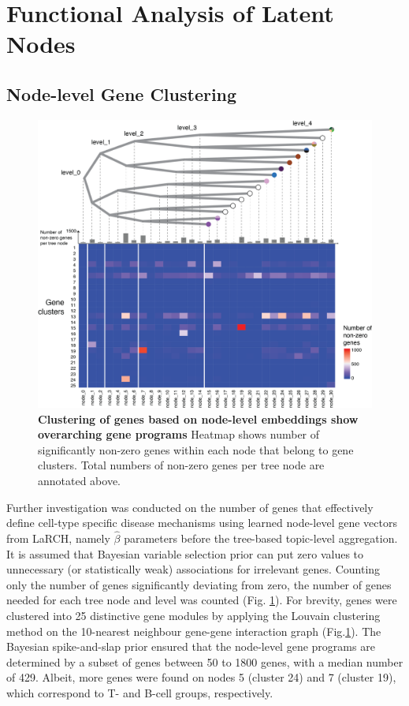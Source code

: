 \newpage
\section{Functional Analysis of Latent Nodes}

\subsection{Node-level Gene Clustering}

\begin{figure}
    \centering
    \includegraphics[width=\textwidth]{Figures/node_clusters.png}
    \caption{\textbf{Clustering of genes based on node-level embeddings show overarching gene programs} Heatmap shows number of significantly non-zero genes within each node that belong to gene clusters. Total numbers of non-zero genes per tree node are annotated above.}
    \label{fig:nodeanalysis}
\end{figure}

Further investigation was conducted on the number of genes that effectively define cell-type specific disease mechanisms using learned node-level gene vectors from LaRCH, namely $\hat{\beta}$ parameters before the tree-based topic-level aggregation. It is assumed that Bayesian variable selection prior can put zero values to unnecessary (or statistically weak) associations for irrelevant genes. Counting only the number of genes significantly deviating from zero, the number of genes needed for each tree node and level was counted (Fig. \ref{fig:nodeanalysis}). For brevity, genes were clustered into 25 distinctive gene modules by applying the Louvain clustering method on the 10-nearest neighbour gene-gene interaction graph (Fig.\ref{fig:nodeanalysis}). The Bayesian spike-and-slap prior ensured that the node-level gene programs are determined by a subset of genes between 50 to 1800 genes, with a median number of 429. Albeit, more genes were found on nodes 5 (cluster 24) and 7 (cluster 19), which correspond to T- and B-cell groups, respectively.

